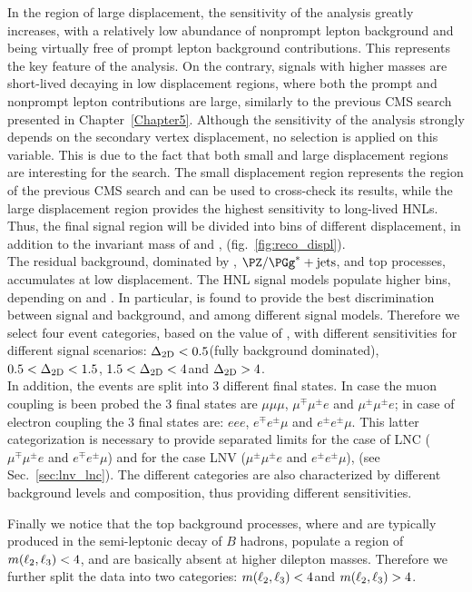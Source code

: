 In the region of large displacement, the sensitivity of the analysis
greatly increases, with a relatively low abundance of nonprompt lepton
background and being virtually free of prompt lepton background
contributions. This represents the key feature of the analysis.
On the contrary, signals with higher masses are short-lived \hnl
decaying in low displacement regions, where both the prompt and
nonprompt lepton contributions are large, similarly to the previous
CMS search presented in Chapter~\ref{Chapter5}.
Although the sensitivity of the analysis strongly depends on the
secondary vertex displacement, no selection is applied on this
variable. This is due to the fact that both small and large
displacement regions are interesting for the search. The small
displacement region represents the region of the previous CMS search
and can be used to cross-check its results, while the large
displacement region provides the highest sensitivity to long-lived
HNLs. 
Thus, the final signal region will be divided into bins of different
displacement, in addition to the invariant mass of \ltwo and \lthree,
\mtwol (fig.~\ref{fig:reco_displ}).\\

The residual background, dominated by \Xg,
$\PZ/\PGg^{\ast}+\mathrm{jets}$, and top processes, accumulates at low
displacement. The HNL signal models populate higher \Deltwod bins, depending on \mhnl and \mixpar. In particular, \Deltwod
is found to provide the best discrimination between signal and
background, and among different signal models.
Therefore we select four event categories, based on the value of
\Deltwod, with different sensitivities for different signal
scenarios:
$\Delta_{\mathrm{2D}}<0.5$\cm (fully background dominated), $0.5<\Delta_{\mathrm{2D}}<1.5$\cm,
$1.5<\Delta_{\mathrm{2D}}<4$\cm and $\Delta_{\mathrm{2D}}>4$\cm.\\
In addition, the events are split into 3 different final states. In case 
the muon coupling is been probed the 3 final states are $\mu\mu\mu$,  $\mu^{\mp}\mu^{\pm} e$ 
and $\mu^{\pm}\mu^{\pm}e$; in case of electron coupling the 3 final states
are: $eee$,  $e^{\mp}e^{\pm}\mu$ and $e^{\pm}e^{\pm}\mu$. This latter categorization
is necessary to provide separated limits for the case of LNC ($\mu^{\mp}\mu^{\pm} e$ and $e^{\mp}e^{\pm}\mu$)
and for the case LNV ($\mu^{\pm}\mu^{\pm} e$ and $e^{\pm}e^{\pm}\mu$), (see Sec.~\ref{sec:lnv_lnc}).
The different categories are also characterized by different
background levels and composition, thus providing different
sensitivities.

Finally we notice that the top background processes, where \ltwo and
\lthree are typically produced in the semi-leptonic decay of $B$
hadrons, populate a region of $m(\ell_2,\ell_3)<4$\GeV, and are basically absent
at higher dilepton masses. Therefore we further split the data into
two categories: $m(\ell_2,\ell_3)<4$\GeV and $m(\ell_2,\ell_3)>4$\GeV. 
\vspace{12mm}

